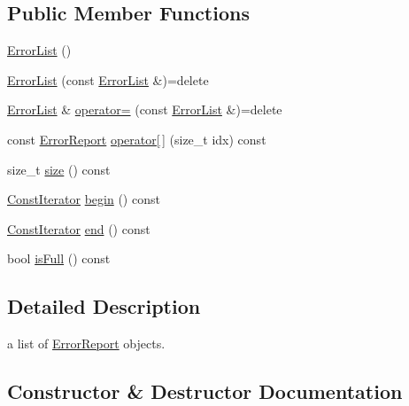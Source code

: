 \subsection*{Public Member Functions}
\begin{DoxyCompactItemize}
\item 
\hyperlink{class_frame_lib___error_reporter_1_1_error_list_ae39328c0007aa67c2296b3137df89c42}{Error\+List} ()
\item 
\hyperlink{class_frame_lib___error_reporter_1_1_error_list_a22a344bdfe3b6387e47d9d941ffc14fc}{Error\+List} (const \hyperlink{class_frame_lib___error_reporter_1_1_error_list}{Error\+List} \&)=delete
\item 
\hyperlink{class_frame_lib___error_reporter_1_1_error_list}{Error\+List} \& \hyperlink{class_frame_lib___error_reporter_1_1_error_list_a098db3f93cf3c57fcc306143a8f67475}{operator=} (const \hyperlink{class_frame_lib___error_reporter_1_1_error_list}{Error\+List} \&)=delete
\item 
const \hyperlink{class_frame_lib___error_reporter_1_1_error_report}{Error\+Report} \hyperlink{class_frame_lib___error_reporter_1_1_error_list_a5a2d2275105cf1fc68a56c4a7b50f058}{operator\mbox{[}$\,$\mbox{]}} (size\+\_\+t idx) const
\item 
size\+\_\+t \hyperlink{class_frame_lib___error_reporter_1_1_error_list_a7566d9addd382eaf763abfe64c0dbc3a}{size} () const
\item 
\hyperlink{class_frame_lib___error_reporter_1_1_error_list_1_1_const_iterator}{Const\+Iterator} \hyperlink{class_frame_lib___error_reporter_1_1_error_list_a56d31ffefac129cdf7b54d2d797005ca}{begin} () const
\item 
\hyperlink{class_frame_lib___error_reporter_1_1_error_list_1_1_const_iterator}{Const\+Iterator} \hyperlink{class_frame_lib___error_reporter_1_1_error_list_abf9b00eaec6c62d7bc82748f0328f33f}{end} () const
\item 
bool \hyperlink{class_frame_lib___error_reporter_1_1_error_list_acb792f2669598cc02842aaf1d2057fb7}{is\+Full} () const
\end{DoxyCompactItemize}


\subsection{Detailed Description}
a list of \hyperlink{class_frame_lib___error_reporter_1_1_error_report}{Error\+Report} objects. 

\subsection{Constructor \& Destructor Documentation}
\mbox{\label{class_frame_lib___error_reporter_1_1_error_list_ae39328c0007aa67c2296b3137df89c42}} 
